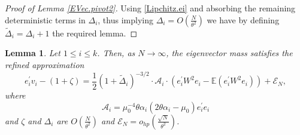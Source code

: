 \documentclass[11pt, reqno]{amsart}
\numberwithin{equation}{section}
\newtheorem{lemma}{Lemma}[section]
\begin{document}
\begin{proof}[Proof of Lemma \ref{EVec.pivot2}]
Using \eqref{Lipchitz.ei} and absorbing the remaining deterministic terms in $\Delta_i$, thus implying $\Delta_i=O\left(\frac{N}{\theta^2}\right)$ we have by defining $\tilde \Delta_i=\Delta_i+1$ the required lemma.
\end{proof}


\begin{lemma}\label{EVec.pivot3}
Let \(1 \le i \le k\). Then, as \(N \to \infty\), the eigenvector mass satisfies the refined approximation
\[
e_i^\prime v_i-(1+\zeta)
= \frac{1}{2} (1 + \tilde\Delta_i)^{-3/2} \cdot \mathcal A_i\cdot \left(e_i^\prime W^2 e_i - \mathbb{E}(e_i^\prime W^2 e_i)\right) + \mathcal{E}_N,
\]
where $$\mathcal A_i= \mu_0^{-4} \theta \alpha_i (2\theta \alpha_i - \mu_0) e_i^\prime e_i$$
and \(\zeta\) and \(\Delta_i\) are \(O\left(\frac{N}{\theta^2}\right)\) and \(\mathcal{E}_N = o_{hp}\left(\frac{\sqrt{N}}{\theta^2}\right)\).

\end{lemma}
\end{document}
